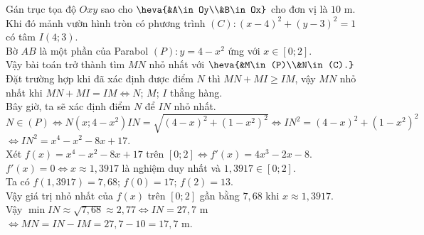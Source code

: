 \begin{ex}
{\begin{center}
		\end{center}
		Gán trục tọa độ $Oxy$ sao cho $\heva{&A\in Oy\\&B\in Ox}$ cho đơn vị là $10$ m.\\
		Khi đó mảnh vườn hình tròn có phương trình $(C)\colon (x-4)^2+(y-3)^2=1$ có tâm $I(4;3)$.\\
		Bờ $AB$ là một phần của Parabol $(P)\colon y=4-x^2$ ứng với $x\in[0;2]$.\\
		Vậy bài toán trở thành tìm $MN$ nhỏ nhất với $\heva{&M\in(P)\\&N\in(C).}$ \\
		Đặt trường hợp khi đã xác định được điểm $N$ thì $MN+MI\geq IM$, vậy $MN$ nhỏ nhất khi $MN+MI=IM\Leftrightarrow N$; $M$; $I$ thẳng hàng.\\
		Bây giờ, ta sẽ xác định điểm $N$ để $IN$ nhỏ nhất.\\
		$N\in(P)\Leftrightarrow N\left(x;4-x^2\right) IN=\sqrt{(4-x)^2+\left(1-x^2\right)^2}\Leftrightarrow IN^2=(4-x)^2+\left(1-x^2\right)^2$ \\
		$ \Leftrightarrow IN^2=x^4-x^2-8x+17 $.\\
		Xét $f(x)=x^4-x^2-8x+17$ trên $[0;2]\Leftrightarrow f'(x)=4x^3-2x-8$.\\
		$f'(x)=0\Leftrightarrow x\approx 1,3917$ là nghiệm duy nhất và $1,3917\in[0;2]$.\\
		Ta có $f(1,3917)=7,68$; $f(0)=17$; $f(2)=13$.\\
		Vậy giá trị nhỏ nhất của $f(x)$ trên $[0;2]$ gần bằng $7,68$ khi $x\approx 1,3917$.\\
		Vậy $\min IN\approx\sqrt{7,68}\approx 2,77\Leftrightarrow IN=27,7$ m $\Leftrightarrow MN=IN-IM=27,7-10=17,7$ m.}
\end{ex}
